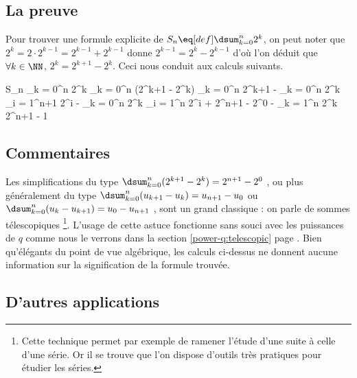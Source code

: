 \subsection{La preuve}

Pour trouver une formule explicite de $S_n \eq[def] \dsum_{k = 0}^{n} 2^k$, on peut noter que
$2^k = 2 \cdot 2^{k-1} = 2^{k-1} + 2^{k-1}$
donne
$2^{k-1} = 2^k - 2^{k-1}$
d'où l'on déduit que
$\forall k \in \NN$, $2^k = 2^{k+1} - 2^k$.
Ceci nous conduit aux calculs suivants.

\begin{focusproof}
\begin{stepcalc}[style = sar]
	S_n 
		\explnext[{\eq[def]}]{}
	\dsum_{k = 0}^{n} 2^k
		\explnext{}
	\dsum_{k = 0}^{n} (2^{k+1} - 2^k)
		\explnext{}
	\dsum_{k = 0}^{n} 2^{k+1} - \dsum_{k = 0}^{n} 2^k
	\dsum_{i = 1}^{n+1} 2^{i} - \dsum_{k = 0}^{n} 2^k
	\dsum_{i = 1}^{n} 2^{i} + 2^{n+1} - 2^0 - \dsum_{k = 1}^{n} 2^k
		\explnext{}
	2^{n+1} - 1
\end{stepcalc}
\end{focusproof}




\subsection{Commentaires}

Les simplifications du type
$\dsum_{k = 0}^{n} (2^{k+1} - 2^k) = 2^{n+1} - 2^0$ ,
ou plus généralement du type
$\dsum_{k = 0}^{n} (u_{k+1} - u_{k}) = u_{n+1} - u_0$
ou
$\dsum_{k = 0}^{n} (u_{k} - u_{k+1}) = u_0 - u_{n+1}$ ,
sont un grand classique : on parle de \og sommes télescopiques \fg{}
\footnote{
	Cette technique permet par exemple de ramener l'étude d'une suite à celle d'une série.
	Or il se trouve que l'on dispose d'outils très pratiques pour étudier les séries.
}.
L'usage de cette astuce fonctionne sans souci avec les puissances de $q$ comme nous le verrons dans la section \ref{power-q:telescopic} page \pageref{power-q:telescopic}.
Bien qu'élégants du point de vue algébrique, les calculs ci-dessus ne donnent aucune information sur la signification de la formule trouvée.




\subsection{D'autres applications}

